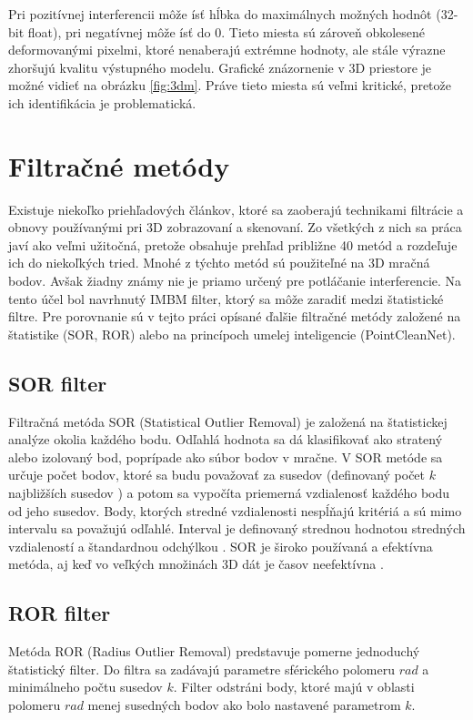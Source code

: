 Pri pozitívnej interferencii môže ísť hĺbka do maximálnych možných hodnôt (32-bit float), pri negatívnej môže ísť do 0. Tieto miesta sú zároveň obkolesené deformovanými pixelmi, ktoré nenaberajú extrémne hodnoty, ale stále výrazne zhoršujú kvalitu výstupného modelu. Grafické znázornenie v 3D priestore je možné vidieť na obrázku \ref{fig:3dm}. Práve tieto miesta sú veľmi kritické, pretože ich identifikácia je problematická. 

\section{Filtračné metódy}
\label{sec:filtmethods}

Existuje niekoľko priehľadových článkov, ktoré sa zaoberajú technikami filtrácie a obnovy používanými pri 3D zobrazovaní a skenovaní. Zo všetkých z nich sa práca \cite{Han} javí ako veľmi užitočná, pretože obsahuje prehľad približne 40 metód a rozdeľuje ich do niekoľkých tried. Mnohé z týchto metód sú použiteľné na 3D mračná bodov. Avšak žiadny známy nie je priamo určený pre potláčanie interferencie. Na tento účel bol navrhnutý IMBM filter, ktorý sa môže zaradiť medzi štatistické filtre. Pre porovnanie sú v tejto práci opísané ďalšie filtračné metódy založené na štatistike (SOR, ROR) alebo na princípoch umelej inteligencie (PointCleanNet).   

\subsection{SOR filter}

Filtračná metóda SOR (Statistical Outlier Removal) je založená na štatistickej analýze okolia každého bodu. Odľahlá hodnota sa dá klasifikovať ako stratený alebo izolovaný bod, poprípade ako súbor bodov v mračne. V SOR metóde sa určuje počet bodov, ktoré sa budu považovať za susedov (definovaný počet $k$ najbližších susedov \cite{Pirate}) a potom sa vypočíta priemerná vzdialenosť každého bodu od jeho susedov. Body, ktorých stredné vzdialenosti nespĺňajú kritériá a sú mimo intervalu sa považujú odľahlé. Interval je definovaný strednou hodnotou stredných vzdialeností a štandardnou odchýlkou \cite{Corso}. SOR je široko používaná a efektívna metóda, aj keď vo veľkých množinách 3D dát je časov neefektívna  \cite{Balite}.

\subsection{ROR filter}
Metóda ROR (Radius Outlier Removal) predstavuje pomerne jednoduchý štatistický filter. Do filtra sa zadávajú parametre sférického polomeru $rad$ a minimálneho počtu susedov $k$. Filter odstráni body, ktoré majú v oblasti polomeru $rad$ menej susedných bodov ako bolo nastavené parametrom $k$.


